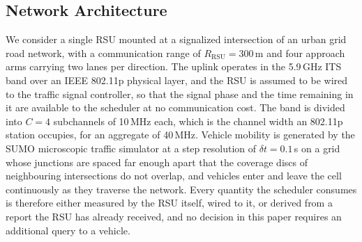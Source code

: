\documentclass[journal]{IEEEtran}
\begin{document}
\subsection{Network Architecture}
We consider a single RSU mounted at a signalized intersection of an urban grid road network, with a communication range of $R_{\mathrm{RSU}} = 300$\,m and four approach arms carrying two lanes per direction. The uplink operates in the 5.9\,GHz ITS band over an IEEE 802.11p physical layer, and the RSU is assumed to be wired to the traffic signal controller, so that the signal phase and the time remaining in it are available to the scheduler at no communication cost. The band is divided into $C = 4$ subchannels of 10\,MHz each, which is the channel width an 802.11p station occupies, for an aggregate of 40\,MHz. Vehicle mobility is generated by the SUMO microscopic traffic simulator at a step resolution of $\delta t = 0.1$\,s on a grid whose junctions are spaced far enough apart that the coverage discs of neighbouring intersections do not overlap, and vehicles enter and leave the cell continuously as they traverse the network. Every quantity the scheduler consumes is therefore either measured by the RSU itself, wired to it, or derived from a report the RSU has already received, and no decision in this paper requires an additional query to a vehicle.
\end{document}
